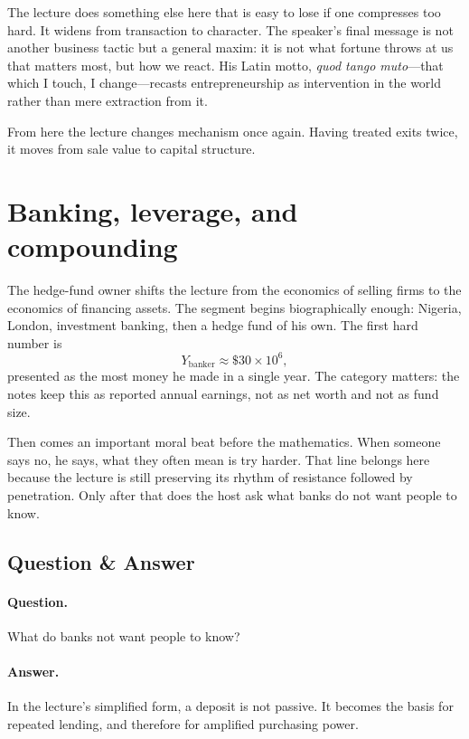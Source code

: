 The lecture does something else here that is easy to lose if one compresses too hard. It widens from transaction to character. The speaker's final message is not another business tactic but a general maxim: it is not what fortune throws at us that matters most, but how we react. His Latin motto, \emph{quod tango muto}---that which I touch, I change---recasts entrepreneurship as intervention in the world rather than mere extraction from it.

From here the lecture changes mechanism once again. Having treated exits twice, it moves from sale value to capital structure.

\section{Banking, leverage, and compounding}

The hedge-fund owner shifts the lecture from the economics of selling firms to the economics of financing assets. The segment begins biographically enough: Nigeria, London, investment banking, then a hedge fund of his own. The first hard number is
\begin{equation}
Y_{\text{banker}} \approx \$30 \times 10^6,
\end{equation}
presented as the most money he made in a single year. The category matters: the notes keep this as reported annual earnings, not as net worth and not as fund size.

Then comes an important moral beat before the mathematics. When someone says no, he says, what they often mean is try harder. That line belongs here because the lecture is still preserving its rhythm of resistance followed by penetration. Only after that does the host ask what banks do not want people to know.

\subsection{Question \& Answer}

\paragraph{Question.} What do banks not want people to know?

\paragraph{Answer.} In the lecture's simplified form, a deposit is not passive. It becomes the basis for repeated lending, and therefore for amplified purchasing power.

